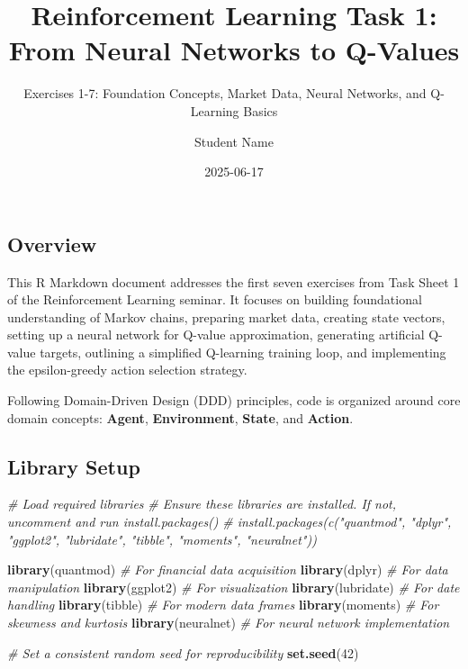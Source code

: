 \documentclass[
]{article}
\title{Reinforcement Learning Task 1: From Neural Networks to Q-Values}
\subtitle{Exercises 1-7: Foundation Concepts, Market Data, Neural
Networks, and Q-Learning Basics}
\author{Student Name}
\date{2025-06-17}
\newenvironment{Shaded}{\begin{snugshade}}{\end{snugshade}}
\newcommand{\CommentTok}[1]{\textcolor[rgb]{0.56,0.35,0.01}{\textit{#1}}}
\newcommand{\DecValTok}[1]{\textcolor[rgb]{0.00,0.00,0.81}{#1}}
\newcommand{\FunctionTok}[1]{\textcolor[rgb]{0.13,0.29,0.53}{\textbf{#1}}}
\newcommand{\NormalTok}[1]{#1}
\begin{document}
\maketitle

{
\setcounter{tocdepth}{2}
\tableofcontents
}
\hypertarget{overview}{%
\subsection{Overview}\label{overview}}

This R Markdown document addresses the first seven exercises from Task
Sheet 1 of the Reinforcement Learning seminar. It focuses on building
foundational understanding of Markov chains, preparing market data,
creating state vectors, setting up a neural network for Q-value
approximation, generating artificial Q-value targets, outlining a
simplified Q-learning training loop, and implementing the epsilon-greedy
action selection strategy.

Following Domain-Driven Design (DDD) principles, code is organized
around core domain concepts: \textbf{Agent}, \textbf{Environment},
\textbf{State}, and \textbf{Action}.

\hypertarget{library-setup}{%
\subsection{Library Setup}\label{library-setup}}

\begin{Shaded}
\begin{Highlighting}[]
\CommentTok{\# Load required libraries}
\CommentTok{\# Ensure these libraries are installed. If not, uncomment and run install.packages()}
\CommentTok{\# install.packages(c("quantmod", "dplyr", "ggplot2", "lubridate", "tibble", "moments", "neuralnet"))}

\FunctionTok{library}\NormalTok{(quantmod)    }\CommentTok{\# For financial data acquisition}
\FunctionTok{library}\NormalTok{(dplyr)       }\CommentTok{\# For data manipulation}
\FunctionTok{library}\NormalTok{(ggplot2)     }\CommentTok{\# For visualization}
\FunctionTok{library}\NormalTok{(lubridate)   }\CommentTok{\# For date handling}
\FunctionTok{library}\NormalTok{(tibble)      }\CommentTok{\# For modern data frames}
\FunctionTok{library}\NormalTok{(moments)     }\CommentTok{\# For skewness and kurtosis}
\FunctionTok{library}\NormalTok{(neuralnet)   }\CommentTok{\# For neural network implementation}

\CommentTok{\# Set a consistent random seed for reproducibility}
\FunctionTok{set.seed}\NormalTok{(}\DecValTok{42}\NormalTok{)}
\end{Highlighting}
\end{Shaded}
\end{document}

